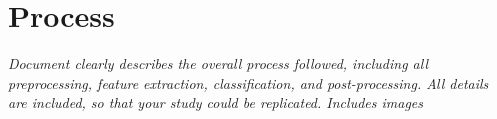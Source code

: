 \section{Process}
\textit{Document clearly describes the overall process followed, including all preprocessing, feature extraction, classification, and post-processing. All details are included, so that your study could be replicated. Includes images
}
%

%

%
